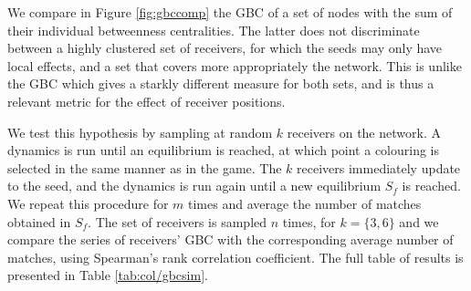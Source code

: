 We compare in Figure \ref{fig:gbccomp} the GBC of a set of nodes with the sum of their individual betweenness centralities. The latter does not discriminate between a highly clustered set of receivers, for which the seeds may only have local effects, and a set that covers more appropriately the network. This is unlike the GBC which gives a starkly different measure for both sets, and is thus a relevant metric for the effect of receiver positions.

We test this hypothesis by sampling at random \( k \) receivers on the network. A dynamics is run until an equilibrium is reached, at which point a colouring is selected in the same manner as in the game. The \( k \) receivers immediately update to the seed, and the dynamics is run again until a new equilibrium \( S_f \) is reached. We repeat this procedure for \( m \) times and average the number of matches obtained in \( S_f \). The set of receivers is sampled \( n \) times, for \( k = \{3, 6\} \) and we compare the series of receivers' GBC with the corresponding average number of matches, using Spearman's rank correlation coefficient. The full table of results is presented in Table \ref{tab:col/gbcsim}.

